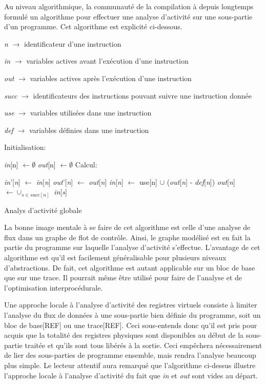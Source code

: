 \documentclass{article} %
\begin{document}
Au niveau algorithmique, la communauté de la compilation à depuis longtemps formulé un algorithme pour effectuer une analyse d'activité sur une sous-partie d'un programme. Cet algorithme est explicité ci-dessous.

\begin{algorithm}[H]
 \KwData
 {
 	
 	\textit{n} $\rightarrow$ identificateur d'une instruction
 
	\textit{in} $\rightarrow$ variables actives avant l'exécution d'une instruction

 	\textit{out} $\rightarrow$ variables actives après l'exécution d'une instruction
 	
 	\textit{succ} $\rightarrow$ identificateurs des instructions pouvant suivre une instruction donnée
 	
 	\textit{use} $\rightarrow$ variables utilisées dans une instruction
 	
 	\textit{def} $\rightarrow$ variables définies dans une instruction
 }
 Initialisation:
 
 {
 	\textit{in}[n] $\leftarrow \emptyset$\;
 	\textit{out}[n] $\leftarrow \emptyset$\;
 }
 Calcul:
 
 {
  	{
  		\textit{in}'[\textit{n}] $\leftarrow$ \textit{in}[\textit{n}]\;
  		\textit{out}'[\textit{n}] $\leftarrow$ \textit{out}[\textit{n}]\;
  		\textit{in}[\textit{n}] $\leftarrow$ use[n] $\cup$ (\textit{out}[\textit{n}] - \textit{def}[\textit{n}])\;
  		\textit{out}[\textit{n}] $\leftarrow \cup_{s \in succ[n]}$ \textit{in}[\textit{s}]\;
  	}
 }
 \caption{Analys d'activité globale}
\end{algorithm}

La bonne image mentale à se faire de cet algorithme est celle d'une analyse de flux dans un graphe de flot de contrôle. Ainsi, le graphe modélisé est en fait la partie du programme sur laquelle l'analyse d'activité s'effectue. L'avantage de cet algorithme est qu'il est facilement généralisable pour plusieurs niveaux d'abstractions. De fait, cet algorithme est autant applicable sur un bloc de base que sur une trace. Il pourrait même être utilisé pour faire de l'analyse et de l'optimisation interprocédurale.

Une approche locale à l'analyse d'activité des registres virtuels consiste à limiter l'analyse du flux de données à une sous-partie bien définie du programme, soit un bloc de base[REF] ou une trace[REF]. Ceci sous-entends donc qu'il est pris pour acquis que la totalité des registres physiques sont disponibles au début de la sous-partie traitée et qu'ils sont tous libérés à la sortie. Ceci empêchera nécessairement de lier des sous-parties de programme ensemble, mais rendra l'analyse beaucoup plus simple. Le lecteur attentif aura remarqué que l'algorithme ci-dessus illustre l'approche locale à l'analyse d'activité du fait que \textit{in} et \textit{out} sont vides au départ.
\end{document}
